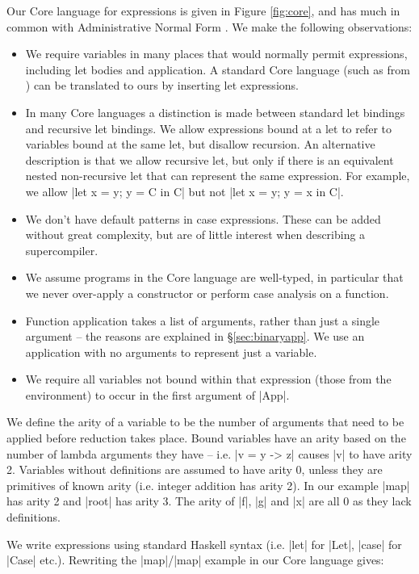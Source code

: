 \documentclass[draft]{sigplanconf}
\begin{document}
Our Core language for expressions is given in Figure \ref{fig:core}, and has much in common with Administrative Normal Form \cite{flanagan:continuations}. We make the following observations:

\begin{itemize}
\item We require variables in many places that would normally permit expressions, including let bodies and application. A standard Core language (such as from \citet{ghc_core}) can be translated to ours by inserting let expressions.
\item In many Core languages a distinction is made between standard let bindings and recursive let bindings. We allow expressions bound at a let to refer to variables bound at the same let, but disallow recursion. An alternative description is that we allow recursive let, but only if there is an equivalent nested non-recursive let that can represent the same expression. For example, we allow |let x = y; y = C in C| but not |let x = y; y = x in C|.
\item We don't have default patterns in case expressions. These can be added without great complexity, but are of little interest when describing a supercompiler.
\item We assume programs in the Core language are well-typed, in particular that we never over-apply a constructor or perform case analysis on a function.
\item Function application takes a list of arguments, rather than just a single argument -- the reasons are explained in \S\ref{sec:binaryapp}. We use an application with no arguments to represent just a variable.
\item We require all variables not bound within that expression (those from the environment) to occur in the first argument of |App|.
\end{itemize}

We define the arity of a variable to be the number of arguments that need to be applied before reduction takes place. Bound variables have an arity based on the number of lambda arguments they have -- i.e. |v = \x y -> z| causes |v| to have arity 2. Variables without definitions are assumed to have arity 0, unless they are primitives of known arity (i.e. integer addition has arity 2). In our example |map| has arity 2 and |root| has arity 3. The arity of |f|, |g| and |x| are all 0 as they lack definitions.

We write expressions using standard Haskell syntax (i.e. |let| for |Let|, |case| for |Case| etc.). Rewriting the |map|/|map| example in our Core language gives:
\end{document}
